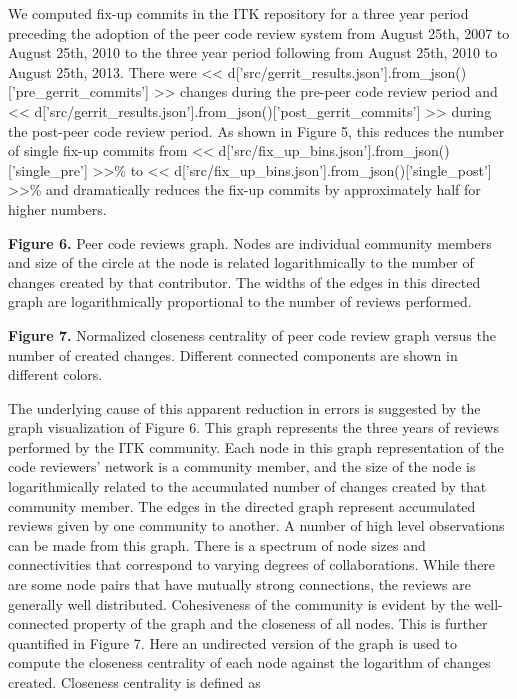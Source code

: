 \documentclass{frontiersENG} %
\begin{document}
We computed fix-up commits in the ITK repository for a three year period
preceding the adoption of the peer code review system from August 25th, 2007
to August 25th, 2010 to the three year period following from August 25th, 2010
to August 25th, 2013.  There were
<< d['src/gerrit_results.json'].from_json()['pre_gerrit_commits'] >>
changes during the pre-peer code review period and
<< d['src/gerrit_results.json'].from_json()['post_gerrit_commits'] >>
during the post-peer code review period.  As shown in
Figure 5, this reduces the number of
single fix-up commits from <<
d['src/fix_up_bins.json'].from_json()['single_pre'] >>\%
to << d['src/fix_up_bins.json'].from_json()['single_post'] >>\% and
dramatically reduces the fix-up commits by approximately half for
higher numbers.

\textbf{Figure 6. } {Peer code reviews graph.  Nodes are individual community
members and size of the circle at the node is related logarithmically to the
number of changes created by that contributor. The widths of the edges in
this directed graph are logarithmically proportional to the number of reviews
performed.} \label{fig:06}

\textbf{Figure 7. }{Normalized closeness centrality of peer code review graph
versus the number of created changes.  Different connected components are shown
in different colors.}\label{fig:07}

The underlying cause of this apparent reduction in errors is suggested by the
graph visualization of Figure 6. This graph represents the three years of
reviews performed by the ITK community. Each node in this graph representation
of the code reviewers' network is a community member, and the size of the node is
logarithmically related to the accumulated number of changes created by that
community member.  The edges in the directed graph represent accumulated
reviews given by one community to another. A number of high level observations
can be made from this graph.  There is a spectrum of node sizes and
connectivities that correspond to varying degrees of collaborations. While there
are some node pairs that have mutually strong connections, the reviews are
generally well distributed.  Cohesiveness of the community is evident by the
well-connected property of the graph and the closeness of all nodes.  This is
further quantified in Figure 7.  Here an undirected version of the graph is
used to compute the closeness centrality of each node against the logarithm of
changes created.  Closeness centrality is defined as \cite{Freeman1979}
\end{document}
